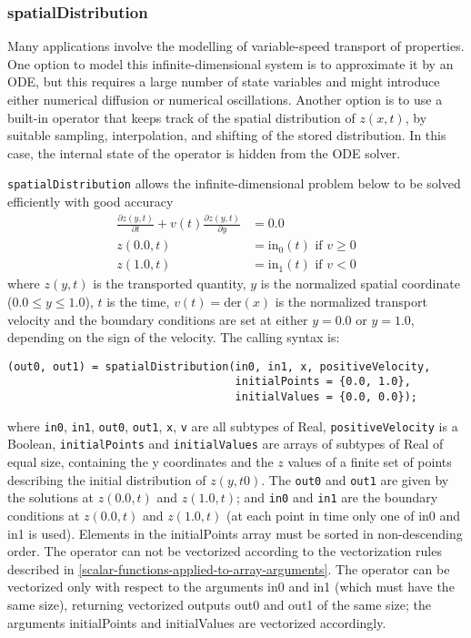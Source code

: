 \subsubsection{spatialDistribution}\label{spatialdistribution}

\begin{nonnormative}
Many applications involve the modelling of variable-speed
transport of properties. One option to model this infinite-dimensional
system is to approximate it by an ODE, but this requires a large number
of state variables and might introduce either numerical diffusion or
numerical oscillations. Another option is to use a built-in operator
that keeps track of the spatial distribution of $z(x, t)$, by suitable
sampling, interpolation, and shifting of the stored distribution. In
this case, the internal state of the operator is hidden from the ODE
solver.
\end{nonnormative}

\lstinline!spatialDistribution! allows the infinite-dimensional problem below to be solved efficiently with good accuracy
\begin{align*}
\frac{\partial z(y,t)}{\partial t}+v(t)\frac{\partial z(y,t)}{\partial y} &= 0.0\\
z(0.0, t) &= \mathrm{in}_0(t) \text{ if $v\ge 0$}\\
z(1.0, t) &= \mathrm{in}_1(t) \text{ if $v<0$}
\end{align*}
where $z(y, t)$ is the transported quantity, $y$ is the
normalized spatial coordinate ($0.0 \le y \le 1.0$), $t$ is the
time, $v(t)=\mathrm{der}(x)$ is the normalized
transport velocity and the boundary conditions are set at either
$y=0.0$ or $y=1.0$, depending on the sign of the velocity.
The calling syntax is:
\begin{lstlisting}[language=modelica]
(out0, out1) = spatialDistribution(in0, in1, x, positiveVelocity,
                                   initialPoints = {0.0, 1.0},
                                   initialValues = {0.0, 0.0});
\end{lstlisting}
where \lstinline!in0!, \lstinline!in1!, \lstinline!out0!, \lstinline!out1!, \lstinline!x!, \lstinline!v! are all subtypes of Real,
\lstinline!positiveVelocity! is a Boolean, \lstinline!initialPoints! and \lstinline!initialValues! are
arrays of subtypes of Real of equal size, containing the y coordinates
and the $z$ values of a finite set of points describing the initial
distribution of $z(y, \mathit{t0})$. The \lstinline!out0! and \lstinline!out1! are given by
the solutions at $z(0.0, t)$ and $z(1.0, t)$; and \lstinline!in0! and \lstinline!in1!
are the boundary conditions at $z(0.0, t)$ and $z(1.0, t)$ (at
each point in time only one of in0 and in1 is used). Elements in the
initialPoints array must be sorted in non-descending order. The operator
can not be vectorized according to the vectorization rules described in
\cref{scalar-functions-applied-to-array-arguments}. The operator can be vectorized only with respect to the
arguments in0 and in1 (which must have the same size), returning
vectorized outputs out0 and out1 of the same size; the arguments
initialPoints and initialValues are vectorized accordingly.

